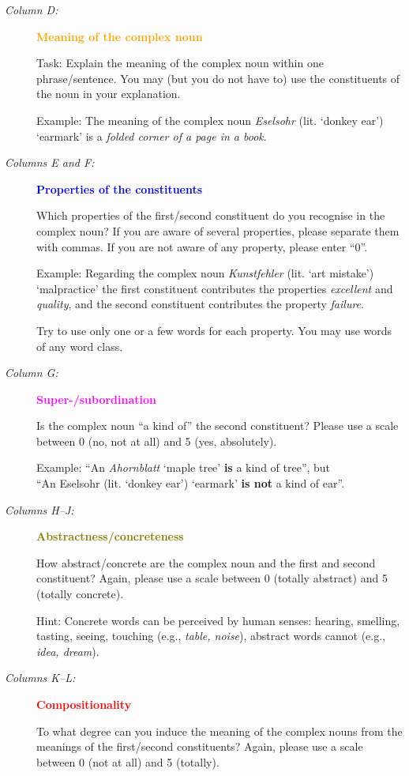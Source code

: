 \documentclass[output=paper,colorlinks,citecolor=brown]{langscibook}
\begin{document}
\begin{description}
\item[\textit{Column D:}] \textcolor{orange}{\textbf{Meaning of the complex noun}}

  Task: Explain the meaning of the complex noun within one phrase/sentence. You may (but you do not have to) use the constituents of the noun in your explanation.

  Example: The meaning of the complex noun \textit{Eselsohr} (lit. `donkey ear') `earmark' is a \textit{folded corner of a page in a book}.

\item[\textit{Columns E and F:}] \textcolor{blue}{\textbf{Properties of the constituents}}

  Which properties of the first/second constituent do you recognise in the complex noun? If you are aware of several properties, please separate them with commas. If you are not aware of any property, please enter ``0''.

  Example: Regarding the complex noun \textit{Kunstfehler} (lit. `art mistake') `malpractice' the first constituent contributes the properties \textit{excellent} and \textit{quality}, and the second constituent contributes the property \textit{failure}.

  Try to use only one or a few words for each property. You may use words of any word class.

\item[\textit{Column G:}] \textcolor{magenta}{\textbf{Super-/subordination}}

  Is the complex noun ``a kind of'' the second constituent? Please use a scale between 0 (no, not at all) and 5 (yes, absolutely).

  Example: ``An \textit{Ahornblatt} `maple tree' \textbf{is} a kind of tree'', but\\\hspace*{+1.55cm}``An Eselsohr (lit. `donkey ear') `earmark' \textbf{is not} a kind of ear''.

\item[\textit{Columns H--J:}] \textcolor{olive}{\textbf{Abstractness/concreteness}}

  How abstract/concrete are the complex noun and the first and second constituent?
  Again, please use a scale between 0 (totally abstract) and 5 (totally concrete).
  
  Hint: Concrete words can be perceived by human senses: hearing, smelling, tasting, seeing, touching (e.g., \textit{table, noise}), abstract words cannot (e.g., \textit{idea, dream}).
  
\item[\textit{Columns K--L:}] \textcolor{red}{\textbf{Compositionality}}

  To what degree can you induce the meaning of the complex nouns from the meanings of the first/second constituents? Again, please use a scale between 0 (not at all) and 5 (totally).
 
\end{description}
\end{document}

